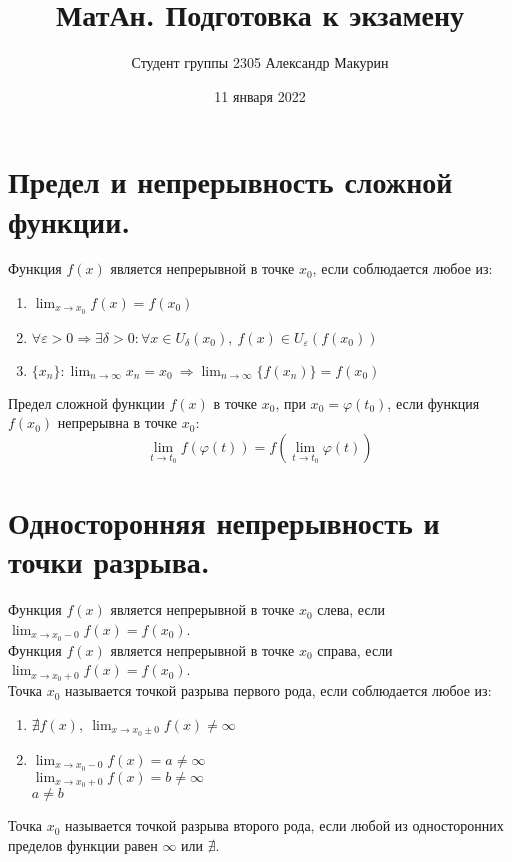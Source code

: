 \documentclass[12pt]{article}
\title{МатАн. Подготовка к экзамену}
\author{Студент группы 2305 Александр Макурин}
\date{11 января 2022}
\begin{document}
\newcommand{\limx}{\displaystyle\lim_{x \rightarrow x_0}}
\newcommand{\overo}{\overline{o}}

\maketitle

\begin{sloppypar}

    \setcounter{section}{10}
    \section{Предел и непрерывность сложной функции.}
    Функция $f(x)$ является непрерывной в точке $x_0$, если соблюдается любое из:
    \begin{enumerate}
        \item $\displaystyle \lim_{x \rightarrow x_0} f(x) = f(x_0)$
        \item $\forall \varepsilon > 0 \Rightarrow \exists \delta > 0 : \forall x \in U_{\delta}(x_0), \  f(x) \in U_{\varepsilon}(f(x_0))$
        \item $\{x_n\} : \displaystyle \lim_{n\rightarrow \infty} x_n = x_0 \ \Rightarrow \lim_{n \rightarrow \infty} \{f(x_n)\} = f(x_0)$
    \end{enumerate}
    Предел сложной функции $f(x)$ в точке $x_0$, при $x_0 = \varphi(t_0)$, если функция $f(x_0)$ непрерывна в точке $x_0$:
    \[
        \lim_{t \rightarrow t_0}f(\varphi(t)) = f(\lim_{t \rightarrow t_0} \varphi(t))
    \]

    \section{Односторонняя непрерывность и точки разрыва.}
    Функция $f(x)$ является непрерывной в точке $x_0$ слева, если $\displaystyle \lim_{x \rightarrow x_0 - 0} f(x) = f(x_0)$. \\
    Функция $f(x)$ является непрерывной в точке $x_0$ справа, если $\displaystyle \lim_{x \rightarrow x_0 + 0} f(x) = f(x_0)$. \\
    Точка $x_0$ называется точкой разрыва первого рода, если соблюдается любое из:
    \begin{enumerate}
        \item $\nexists f(x),\ \displaystyle \lim_{x \rightarrow x_0 \pm 0}f(x) \neq \infty$
        \item $\displaystyle \lim_{x \rightarrow x_0 - 0}f(x) = a \neq \infty$ \\
              $\displaystyle \lim_{x \rightarrow x_0 + 0}f(x) = b \neq \infty$ \\
              $a \neq b$
    \end{enumerate}
    Точка $x_0$ называется точкой разрыва второго рода, если любой из односторонних пределов функции равен $\infty$ или $\nexists$.


\end{sloppypar}
\end{document}
